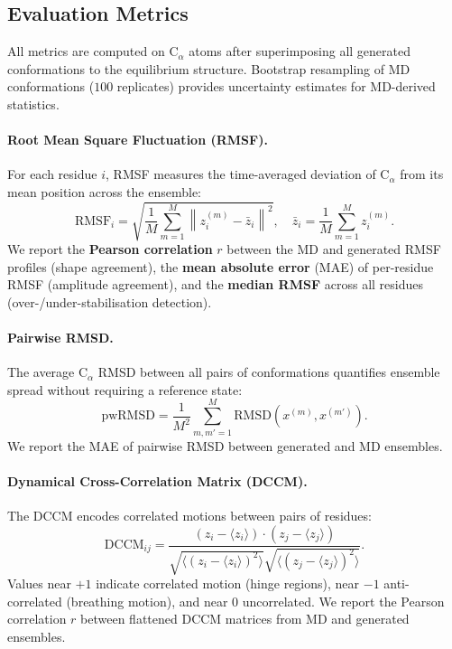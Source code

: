 \documentclass[12pt,a4paper]{article}
\newcommand{\norm}[1]{\left\|#1\right\|}
\begin{document}
\subsection{Evaluation Metrics}
\label{sec:metrics}

All metrics are computed on C$_\alpha$ atoms after superimposing all generated conformations
to the equilibrium structure.  Bootstrap resampling of MD conformations ($100$ replicates)
provides uncertainty estimates for MD-derived statistics.

\paragraph{Root Mean Square Fluctuation (RMSF).}
For each residue $i$, RMSF measures the time-averaged deviation of C$_\alpha$ from its mean
position across the ensemble:
\begin{equation}
  \mathrm{RMSF}_i = \sqrt{\frac{1}{M}\sum_{m=1}^M \norm{z_i^{(m)} - \bar{z}_i}^2},
  \quad \bar{z}_i = \frac{1}{M}\sum_{m=1}^M z_i^{(m)}.
\end{equation}
We report the \textbf{Pearson correlation} $r$ between the MD and generated RMSF profiles
(shape agreement), the \textbf{mean absolute error} (MAE) of per-residue RMSF (amplitude
agreement), and the \textbf{median RMSF} across all residues (over-/under-stabilisation
detection).

\paragraph{Pairwise RMSD.}
The average C$_\alpha$ RMSD between all pairs of conformations quantifies ensemble spread
without requiring a reference state:
\begin{equation}
  \mathrm{pwRMSD} = \frac{1}{M^2}\sum_{m,m'=1}^M \mathrm{RMSD}(x^{(m)}, x^{(m')}).
\end{equation}
We report the MAE of pairwise RMSD between generated and MD ensembles.

\paragraph{Dynamical Cross-Correlation Matrix (DCCM).}
The DCCM encodes correlated motions between pairs of residues:
\begin{equation}
  \mathrm{DCCM}_{ij} = \frac{(z_i - \langle z_i\rangle)\cdot(z_j - \langle z_j\rangle)}
    {\sqrt{\langle(z_i - \langle z_i\rangle)^2\rangle}\sqrt{\langle(z_j - \langle z_j\rangle)^2\rangle}}.
\end{equation}
Values near $+1$ indicate correlated motion (hinge regions), near $-1$ anti-correlated (breathing
motion), and near $0$ uncorrelated.  We report the Pearson correlation $r$ between flattened
DCCM matrices from MD and generated ensembles.
\end{document}
